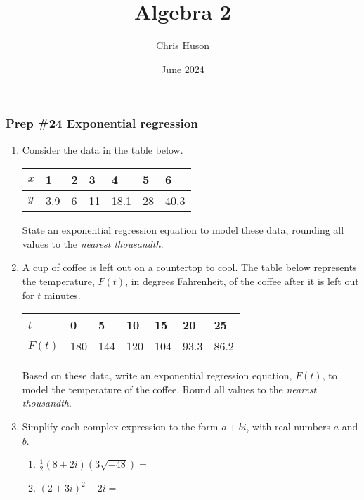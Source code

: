 \documentclass[12pt, twoside]{article}
\title{Algebra 2}
\author{Chris Huson}
\date{June 2024}
\begin{document}
\subsubsection*{Prep \#24 Exponential regression}
\begin{enumerate}[itemsep=0.5cm]
    \item Consider the data in the table below.
    \begin{center}
    \begin{tabular}{|p{1cm}|p{1cm}|p{1cm}|p{1cm}|p{1cm}|p{1cm}|p{1cm}|}
        \hline
        $x$ & 1 & 2 & 3 & 4 & 5 & 6 \\
        \hline
        $y$ & 3.9 & 6 & 11 & 18.1 & 28 & 40.3 \\[0.25cm]
        \hline
    \end{tabular}
    \end{center}
    State an exponential regression equation to model these data, rounding all values to the \emph{nearest thousandth}.  \vspace{4cm} %

\item A cup of coffee is left out on a countertop to cool. The table below represents the temperature, $F(t)$, in degrees Fahrenheit, of the coffee after it is left out for $t$ minutes.
    \begin{center}
    \begin{tabular}{|p{1cm}|p{1cm}|p{1cm}|p{1cm}|p{1cm}|p{1cm}|p{1cm}|}
        \hline
        $t$ & 0 & 5 & 10 & 15 & 20 & 25 \\
        \hline
        $F(t)$ & 180 & 144 & 120 & 104 & 93.3 & 86.2 \\[0.25cm]
        \hline
    \end{tabular}
    \end{center}
    Based on these data, write an exponential regression equation, $F(t)$, to model the temperature of the coffee. Round all values to the \emph{nearest thousandth}.  \vspace{4cm} %

\newpage
\item Simplify each complex expression to the form $a+bi$, with real numbers $a$ and $b$.
\begin{multicols}{2}
\begin{enumerate}
    \item $\frac{1}{2}(8+2i)(3\sqrt{-48})=$
    \item $(2+3i)^2-2i=$
\end{enumerate}
\end{multicols} \vspace{4cm}


\end{enumerate}
\end{document}
